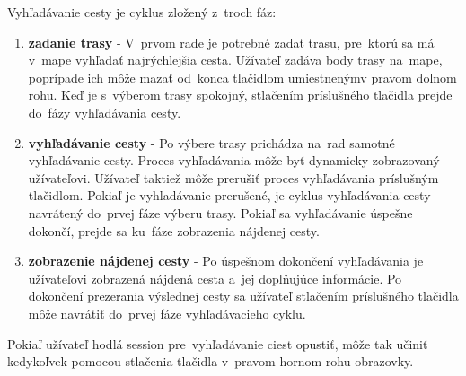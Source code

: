 \documentclass[12pt,a4paper]{report}
\begin{document}
Vyhľadávanie cesty je cyklus zložený z~troch fáz:
\begin{enumerate}
    \item \textbf{zadanie trasy} - V~prvom rade je potrebné zadať trasu, pre~ktorú sa má v~mape vyhľadať najrýchlejšia cesta. Užívateľ zadáva body trasy na~mape, poprípade ich môže mazať od~konca tlačidlom umiestnenýmv pravom dolnom rohu. Keď je s~výberom trasy spokojný, stlačením príslušného tlačidla prejde do~fázy vyhľadávania cesty.
    \item \textbf{vyhľadávanie cesty} - Po výbere trasy prichádza na~rad samotné vyhľadávanie cesty. Proces vyhľadávania môže byť dynamicky zobrazovaný užívateľovi. Užívateľ taktiež môže prerušiť proces vyhľadávania príslušným tlačidlom. Pokiaľ je vyhľadávanie prerušené, je cyklus vyhľadávania cesty navrátený do~prvej fáze výberu trasy. Pokiaľ sa vyhľadávanie úspešne dokončí, prejde sa ku~fáze zobrazenia nájdenej cesty.
    \item \textbf{zobrazenie nájdenej cesty} - Po úspešnom dokončení vyhľadávania je užívateľovi zobrazená nájdená cesta a~jej doplňujúce informácie. Po dokončení prezerania výslednej cesty sa užívateľ stlačením príslušného tlačidla môže navrátiť do~prvej fáze vyhľadávacieho cyklu.
\end{enumerate}

Pokiaľ užívateľ hodlá session pre~vyhľadávanie ciest opustiť, môže tak učiniť kedykoľvek pomocou stlačenia tlačidla v~pravom hornom rohu obrazovky. 
\end{document}
